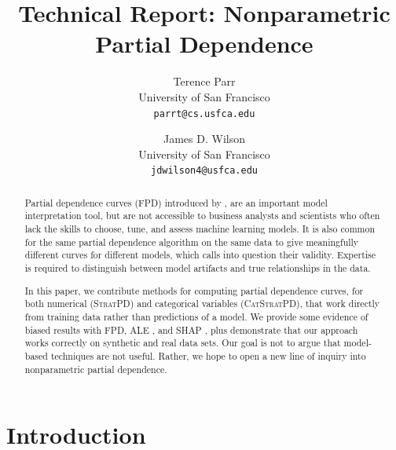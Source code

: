 \documentclass[]{article} %
\newcommand{\cut}[1]{}
\newcommand{\spd}{\fontfamily{cmr}\textsc{\small StratPD}}
\newcommand{\cspd}{\fontfamily{cmr}\textsc{\small CatStratPD}}
\begin{document}
\title{Technical Report: Nonparametric Partial Dependence}

\author{Terence Parr\\
  University of San Francisco\\
  {\tt\small parrt@cs.usfca.edu}
  \and
  James D. Wilson \\
  University of San Francisco\\
  {\tt\small jdwilson4@usfca.edu} 
}

\cut{ %
\author{Terence Parr \and James D. Wilson}
\institute{Terence Parr \at
  University of San Francisco\\
  \email{{\tt parrt@cs.usfca.edu}}
  \and
  James D. Wilson \at
  University of San Francisco\\
  \email{{\tt jdwilson4@usfca.edu}} 
}
}


\maketitle

\begin{abstract}
Partial dependence curves (FPD) introduced by \citet{PDP}, are an important model interpretation tool, but are not accessible to business analysts and scientists who often lack the skills to choose, tune, and assess machine learning models.  It is also common for the same partial dependence algorithm on the same data to give meaningfully different curves for different models, which calls into question their validity.  Expertise is required to distinguish between model artifacts and true relationships in the data.

In this paper, we contribute methods for computing partial dependence curves, for both numerical (\spd) and categorical variables (\cspd), that work directly from training data rather than predictions of a model. We provide some evidence of biased results with FPD, ALE \citep{ALE}, and SHAP \citep{shap}, plus demonstrate that our approach works correctly on synthetic and real data sets.  Our goal is not to argue that model-based techniques are not useful. Rather, we hope to open a new line of inquiry into nonparametric partial dependence.
\end{abstract}

\section{Introduction}
\end{document}
